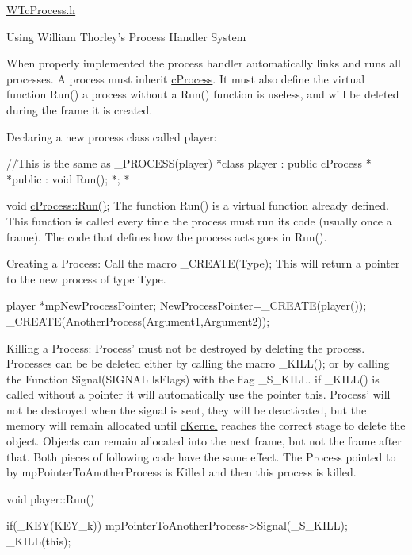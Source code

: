 \hyperlink{_w_tc_process_8h_source}{WTcProcess.h}

Using William Thorley’s Process Handler System

When properly implemented the process handler automatically links and runs all processes. A process must inherit \hyperlink{classc_process}{cProcess}. It must also define the virtual function Run() a process without a Run() function is useless, and will be deleted during the frame it is created.

Declaring a new process class called player: 
\begin{DoxyCode}
 //This is the same as _PROCESS(player)
 *class player : public cProcess
 *{
         *public :
         void Run();
         *};
         *
\end{DoxyCode}


void \hyperlink{classc_process_a3e0fab4ccc0a8fb065d50eb88b6a0dd5}{cProcess::Run()}; The function Run() is a virtual function already defined. This function is called every time the process must run its code (usually once a frame). The code that defines how the process acts goes in Run().

Creating a Process: Call the macro \_\-CREATE(Type); This will return a pointer to the new process of type Type. 
\begin{DoxyCode}
 player *mpNewProcessPointer;
 NewProcessPointer=_CREATE(player());
 _CREATE(AnotherProcess(Argument1,Argument2));
\end{DoxyCode}


Killing a Process: Process' must not be destroyed by deleting the process. Processes can be be deleted either by calling the macro \_\-KILL(); or by calling the Function Signal(SIGNAL lsFlags) with the flag \_\-S\_\-KILL. if \_\-KILL() is called without a pointer it will automatically use the pointer this. Process' will not be destroyed when the signal is sent, they will be deacticated, but the memory will remain allocated until \hyperlink{classc_kernel}{cKernel} reaches the correct stage to delete the object. Objects can remain allocated into the next frame, but not the frame after that. Both pieces of following code have the same effect. The Process pointed to by mpPointerToAnotherProcess is Killed and then this process is killed. 
\begin{DoxyCode}
 void player::Run()
 {

 if(_KEY(KEY_k))
 {
 mpPointerToAnotherProcess->Signal(_S_KILL);
 _KILL(this);
 }

 }
\end{DoxyCode}



